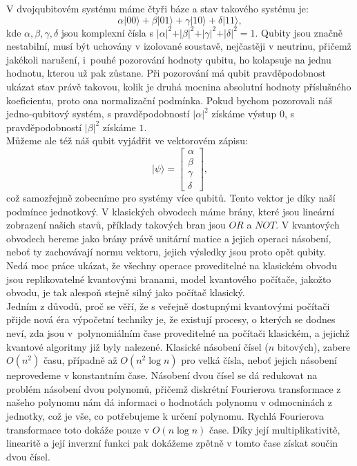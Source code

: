 \documentclass [12pt]{report}
\begin{document}
V dvojqubitovém systému máme čtyři báze a stav takového systému je:
\begin{equation*}
\alpha \vert 00 \rangle + \beta \vert 01 \rangle + \gamma \vert 10 \rangle + \delta \vert 11 \rangle, 
\end{equation*}
kde $\alpha,\beta,\gamma,\delta$ jsou komplexní čísla s $\vert \alpha \vert ^2 + \vert \beta \vert^2 + \vert \gamma \vert^2 + \vert \delta \vert^2 = 1$. Qubity jsou značně nestabilní, musí být uchovány v izolované soustavě, nejčastěji v neutrinu, přičemž jakékoli narušení, i~pouhé pozorování hodnoty qubitu, ho kolapsuje na jednu hodnotu, kterou už pak zůstane. Při pozorování má qubit pravděpodobnost ukázat stav právě takovou, kolik je druhá mocnina absolutní hodnoty příslušného koeficientu, proto ona normalizační podmínka. Pokud bychom pozorovali náš jedno-qubitový systém, s pravděpodobností $\vert \alpha \vert ^2$ získáme výstup $0$, s pravděpodobností $\vert \beta \vert ^2$ získáme $1$.\\

Můžeme ale též náš qubit vyjádřit ve vektorovém zápisu:
\begin{equation*}
\vert \psi \rangle = \begin{bmatrix}
\alpha \\
\beta \\
\gamma \\
\delta
\end{bmatrix},
\end{equation*}
což samozřejmě zobecníme pro systémy více qubitů. Tento vektor je díky naší podmínce jednotkový. V klasických obvodech máme brány, které jsou lineární zobrazení našich stavů, příklady takových bran jsou $OR$ a $NOT$. V kvantových obvodech bereme jako brány právě unitární matice a jejich operaci násobení, neboť ty zachovávají normu vektoru, jejich výsledky jsou proto opět qubity.\\

Nedá moc práce ukázat, že všechny operace proveditelné na klasickém obvodu jsou replikovatelné kvantovými branami, model kvantového počítače, jakožto obvodu, je tak alespoň stejně silný jako počítač klasický.\\

Jedním z důvodů, proč se věří, že s veřejně dostupnými kvantovými počítači přijde nová éra výpočetní techniky je, že existují procesy, o kterých se dodnes neví, zda jsou v~polynomiálním čase proveditelné na počítači klasickém, a jejichž kvantové algoritmy již byly nalezené. Klasické násobení čísel ($n$ bitových), zabere $O(n^2)$ času, případně až $O(n^2 \log n)$ pro velká čísla, neboť jejich násobení neprovedeme v konstantním čase. Násobení dvou čísel se dá redukovat na problém násobení dvou polynomů, přičemž diskrétní Fourierova transformace z našeho polynomu nám dá informaci o hodnotách polynomu v odmocninách z jednotky, což je vše, co potřebujeme k určení polynomu. Rychlá Fourierova transformace toto dokáže pouze v $O(n \log n)$ čase. Díky její multiplikativitě, linearitě a její inverzní funkci pak dokážeme zpětně v tomto čase získat součin dvou čísel.\\
\end{document}
